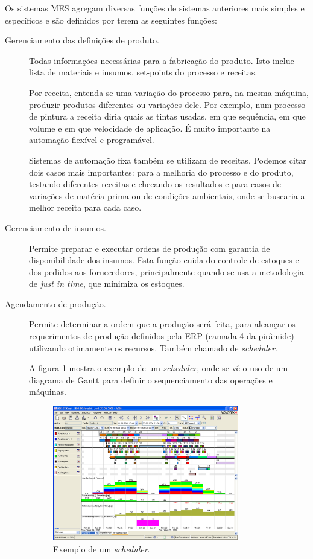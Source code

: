 Os sistemas MES agregam diversas funções de sistemas anteriores mais simples e específicos e são definidos por terem as seguintes funções:
\begin{description}
	\item[Gerenciamento das definições de produto.] Todas informações necessárias para a fabricação do produto. Isto inclue lista de materiais e insumos, set-points do processo e receitas.

	Por receita, entenda-se uma variação do processo para, na mesma máquina, produzir produtos diferentes ou variações dele. Por exemplo, num processo de pintura a receita diria quais as tintas usadas, em que sequência, em que volume e em que velocidade de aplicação. É muito importante na automação flexível e programável.

	Sistemas de automação fixa também se utilizam de receitas. Podemos citar dois casos mais importantes: para a melhoria do processo e do produto, testando diferentes receitas e checando os resultados e para casos de variações de matéria prima ou de condições ambientais, onde se buscaria a melhor receita para cada caso.

	\item[Gerenciamento de insumos.] Permite preparar e executar ordens de produção com garantia de disponibilidade dos insumos. Esta função cuida do controle de estoques e dos pedidos aos fornecedores, principalmente quando se usa a metodologia de \emph{just in time}, que minimiza os estoques.

	\item[Agendamento de produção.] Permite determinar a ordem que a produção será feita, para alcançar os requerimentos de produção definidos pela ERP (camada 4 da pirâmide) utilizando otimamente os recursos. Também chamado de \emph{scheduler}.

	A figura \ref{fig:scheduler} mostra o exemplo de um \emph{scheduler}, onde se vê o uso de um diagrama de Gantt para definir o sequenciamento das operações e máquinas.

	\begin{figure}[hbt]
		\begin{center}
			\includegraphics[width=0.8\textwidth]{./figuras/scheduler}
		\end{center}
		\caption{Exemplo de um \emph{scheduler}.}
		\label{fig:scheduler}
	\end{figure}


\end{description}
